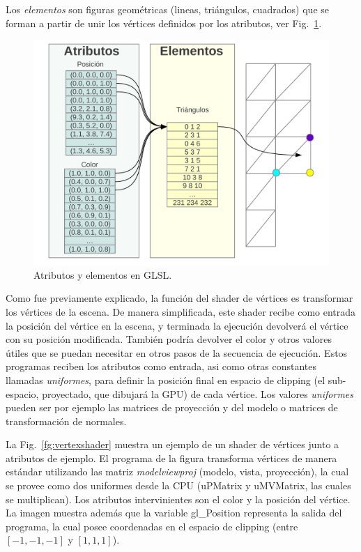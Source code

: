 Los \emph{elementos} son figuras geométricas (lineas, triángulos, cuadrados) que se forman a partir de unir los vértices definidos por los atributos, ver Fig.~\ref{fg:atributos}.

\begin{figure}[h]
\begin{center}
\includegraphics[width=13cm]{figures/atributos}
\end{center}
\caption{Atributos y elementos en GLSL.}
\label{fg:atributos}
\end{figure}

Como fue previamente explicado, la funci\'on del shader de vértices es transformar los v\'ertices de la escena.
De manera simplificada, este shader recibe como entrada la posici\'on del v\'ertice en la escena, y terminada la ejecuci\'on devolver\'a el v\'ertice con su posici\'on modificada.
Tambi\'en podr\'ia devolver el color y otros valores \'utiles que se puedan necesitar en otros pasos de la secuencia de ejecución.
Estos programas reciben los atributos como entrada, asi como otras constantes llamadas \emph{uniformes}, para definir la posición final en espacio de clipping (el sub-espacio, proyectado, que dibujará la GPU) de cada vértice.
Los valores \emph{uniformes} pueden ser por ejemplo las matrices de proyección y del modelo o matrices de transformación de normales. 

La Fig.~\ref{fg:vertexshader} muestra un ejemplo de un shader de vértices junto a atributos de ejemplo.
El programa de la figura transforma vértices de manera estándar utilizando las matriz {\em modelviewproj} (modelo, vista, proyección), la cual se provee como dos uniformes desde la CPU (uPMatrix y uMVMatrix, las cuales se multiplican).
Los atributos intervinientes son el color y la posición del vértice.
La imagen muestra además que la variable gl\_Position representa la salida del programa, la cual posee coordenadas en el espacio de clipping (entre $[-1,-1,-1]$ y $[1,1,1]$).

